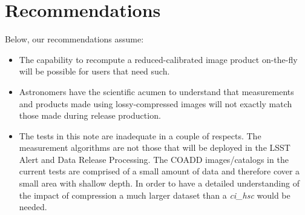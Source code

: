 
\clearpage

\section{Recommendations}

Below, our recommendations assume:
\begin{itemize}
\item The capability to recompute a reduced-calibrated image product on-the-fly will be possible for users that need such.
\item Astronomers have the scientific acumen to understand that measurements and products made using lossy-compressed images will not exactly match those made during release production.
\item The tests in this note are inadequate in a couple of respects.  The measurement algorithms are not those that will be deployed in the LSST Alert and Data Release Processing. The COADD images/catalogs in the current tests are comprised of a small amount of data and therefore cover a small area with shallow depth.  In order to have a detailed understanding of the impact of compression a much larger dataset than a {\it ci\_hsc} would be needed.
\end{itemize}

